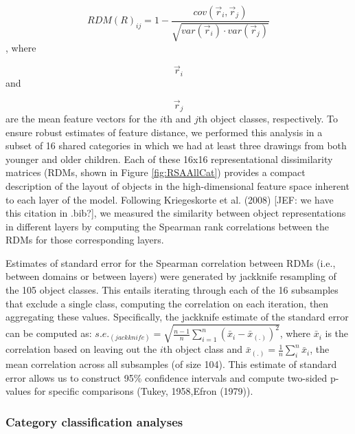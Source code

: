 \documentclass[10pt, letterpaper]{article}
\begin{document}
\[RDM(R)_{ij} = 1- \frac{cov(\vec{r}_{i}, \vec{r}_{j})}{\sqrt{var(\vec{r}_{i}) \cdot var(\vec{r}_{j})}}\],
where

\[\vec{r}_{i}\] and

\[\vec{r}_{j} \] are the mean feature vectors for the \(i\)th and
\(j\)th object classes, respectively. To ensure robust estimates of
feature distance, we performed this analysis in a subset of 16 shared
categories in which we had at least three drawings from both younger and
older children. Each of these 16x16 representational dissimilarity
matrices (RDMs, shown in Figure \ref{fig:RSAAllCat}) provides a compact
description of the layout of objects in the high-dimensional feature
space inherent to each layer of the model. Following Kriegeskorte et al.
(2008) {[}JEF: we have this citation in .bib?{]}, we measured the
similarity between object representations in different layers by
computing the Spearman rank correlations between the RDMs for those
corresponding layers.

Estimates of standard error for the Spearman correlation between RDMs
(i.e., between domains or between layers) were generated by jackknife
resampling of the 105 object classes. This entails iterating through
each of the 16 subsamples that exclude a single class, computing the
correlation on each iteration, then aggregating these values.
Specifically, the jackknife estimate of the standard error can be
computed as:
\(s.e._{(jackknife)} = \sqrt{\frac{n-1}{n} \sum_{i=1}^{n} (\bar{x}_{i} - \bar{x}_{(.)})^{2}}\),
where \(\bar{x}_{i}\) is the correlation based on leaving out the
\(i\)th object class and
\(\bar{x}_{(.)} = \frac{1}{n} \sum_{i}^{n} \bar{x}_{i}\), the mean
correlation across all subsamples (of size 104). This estimate of
standard error allows us to construct 95\% confidence intervals and
compute two-sided p-values for specific comparisons (Tukey, 1958,Efron
(1979)).

\subsubsection{Category classification
analyses}\label{category-classification-analyses}
\end{document}
